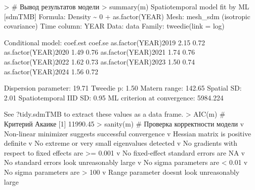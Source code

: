 \documentclass[
  letterpaper,
  DIV=11,
  numbers=noendperiod]{scrreprt}
\newenvironment{Shaded}{\begin{snugshade}}{\end{snugshade}}
\newcommand{\AttributeTok}[1]{\textcolor[rgb]{0.40,0.45,0.13}{#1}}
\newcommand{\CommentTok}[1]{\textcolor[rgb]{0.37,0.37,0.37}{#1}}
\newcommand{\ConstantTok}[1]{\textcolor[rgb]{0.56,0.35,0.01}{#1}}
\newcommand{\DecValTok}[1]{\textcolor[rgb]{0.68,0.00,0.00}{#1}}
\newcommand{\ErrorTok}[1]{\textcolor[rgb]{0.68,0.00,0.00}{#1}}
\newcommand{\FloatTok}[1]{\textcolor[rgb]{0.68,0.00,0.00}{#1}}
\newcommand{\FunctionTok}[1]{\textcolor[rgb]{0.28,0.35,0.67}{#1}}
\newcommand{\NormalTok}[1]{\textcolor[rgb]{0.00,0.23,0.31}{#1}}
\newcommand{\SpecialCharTok}[1]{\textcolor[rgb]{0.37,0.37,0.37}{#1}}
\newcommand{\StringTok}[1]{\textcolor[rgb]{0.13,0.47,0.30}{#1}}
\begin{document}
\begin{Shaded}
\begin{Highlighting}[]
\SpecialCharTok{\textgreater{}} \CommentTok{\# Вывод результатов модели}
\ErrorTok{\textgreater{}} \FunctionTok{summary}\NormalTok{(m)}
\NormalTok{Spatiotemporal model fit by ML [}\StringTok{\textquotesingle{}sdmTMB\textquotesingle{}}\NormalTok{]}
\NormalTok{Formula}\SpecialCharTok{:}\NormalTok{ Density }\SpecialCharTok{\textasciitilde{}} \DecValTok{0} \SpecialCharTok{+} \FunctionTok{as.factor}\NormalTok{(YEAR)}
\NormalTok{Mesh}\SpecialCharTok{:} \FunctionTok{mesh\_sdm}\NormalTok{ (isotropic covariance)}
\NormalTok{Time column}\SpecialCharTok{:}\NormalTok{ YEAR}
\NormalTok{Data}\SpecialCharTok{:}\NormalTok{ data}
\NormalTok{Family}\SpecialCharTok{:} \FunctionTok{tweedie}\NormalTok{(}\AttributeTok{link =} \StringTok{\textquotesingle{}log\textquotesingle{}}\NormalTok{)}
 
\NormalTok{Conditional model}\SpecialCharTok{:}
\NormalTok{                    coef.est coef.se}
\FunctionTok{as.factor}\NormalTok{(YEAR)}\DecValTok{2019}     \FloatTok{2.15}    \FloatTok{0.72}
\FunctionTok{as.factor}\NormalTok{(YEAR)}\DecValTok{2020}     \FloatTok{1.49}    \FloatTok{0.76}
\FunctionTok{as.factor}\NormalTok{(YEAR)}\DecValTok{2021}     \FloatTok{1.74}    \FloatTok{0.76}
\FunctionTok{as.factor}\NormalTok{(YEAR)}\DecValTok{2022}     \FloatTok{1.62}    \FloatTok{0.73}
\FunctionTok{as.factor}\NormalTok{(YEAR)}\DecValTok{2023}     \FloatTok{1.50}    \FloatTok{0.74}
\FunctionTok{as.factor}\NormalTok{(YEAR)}\DecValTok{2024}     \FloatTok{1.56}    \FloatTok{0.72}

\NormalTok{Dispersion parameter}\SpecialCharTok{:} \FloatTok{19.71}
\NormalTok{Tweedie p}\SpecialCharTok{:} \FloatTok{1.50}
\NormalTok{Matern range}\SpecialCharTok{:} \FloatTok{142.65}
\NormalTok{Spatial SD}\SpecialCharTok{:} \FloatTok{2.01}
\NormalTok{Spatiotemporal IID SD}\SpecialCharTok{:} \FloatTok{0.95}
\NormalTok{ML criterion at convergence}\SpecialCharTok{:} \FloatTok{5984.224}

\NormalTok{See ?tidy.sdmTMB to extract these values as a data frame.}
\SpecialCharTok{\textgreater{}} \FunctionTok{AIC}\NormalTok{(m)  }\CommentTok{\# Критерий Акаике}
\NormalTok{[}\DecValTok{1}\NormalTok{] }\FloatTok{11990.45}
\SpecialCharTok{\textgreater{}} \FunctionTok{sanity}\NormalTok{(m)  }\CommentTok{\# Проверка корректности модели}
\NormalTok{v Non}\SpecialCharTok{{-}}\NormalTok{linear minimizer suggests successful convergence}
\NormalTok{v Hessian matrix is positive definite}
\NormalTok{v No extreme or very small eigenvalues detected}
\NormalTok{v No gradients with respect to fixed effects are }\SpecialCharTok{\textgreater{}=} \FloatTok{0.001}
\NormalTok{v No fixed}\SpecialCharTok{{-}}\NormalTok{effect standard errors are }\ConstantTok{NA}
\NormalTok{v No standard errors look unreasonably large}
\NormalTok{v No sigma parameters are }\SpecialCharTok{\textless{}} \FloatTok{0.01}
\NormalTok{v No sigma parameters are }\SpecialCharTok{\textgreater{}} \DecValTok{100}
\NormalTok{v Range parameter doesn}\StringTok{\textquotesingle{}t look unreasonably large}
\end{Highlighting}
\end{Shaded}
\end{document}
